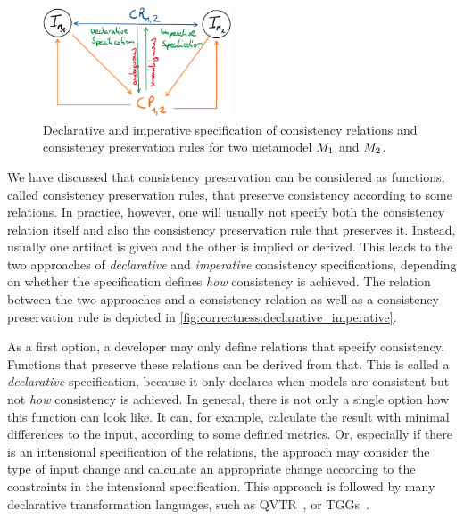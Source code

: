 \begin{figure}
    \centering
    \includegraphics[width=0.5\textwidth]{figures/correctness/notion/declarative_imperative}
    \caption[Declarative and imperative consistency specification]{Declarative and imperative specification of consistency relations and consistency preservation rules for two metamodel $\metamodel{M}{1}$ and $\metamodel{M}{2}$.}
    \label{fig:correctness:declarative_imperative}
\end{figure}

We have discussed that consistency preservation can be considered as functions, called consistency preservation rules, that preserve consistency according to some relations.
In practice, however, one will usually not specify both the consistency relation itself and also the consistency preservation rule that preserves it.
Instead, usually one artifact is given and the other is implied or derived.
This leads to the two approaches of \emph{declarative} and \emph{imperative} consistency specifications, depending on whether the specification defines \emph{how} consistency is achieved.
The relation between the two approaches and a consistency relation as well as a consistency preservation rule is depicted in \autoref{fig:correctness:declarative_imperative}.

As a first option, a developer may only define relations that specify consistency. Functions that preserve these relations can be derived from that.
This is called a \emph{declarative} specification, because it only declares when models are consistent but not \emph{how} consistency is achieved.
In general, there is not only a single option how this function can look like.
It can, for example, calculate the result with minimal differences to the input, according to some defined metrics.
Or, especially if there is an intensional specification of the relations, the approach may consider the type of input change and calculate an appropriate change according to the constraints in the intensional specification.
This approach is followed by many declarative transformation languages, such as \gls{QVTR}~\cite{qvt}, or \glspl{TGG}~\cite{anjorin2014EfficientSynchronizationTGG-ECMFA}.

